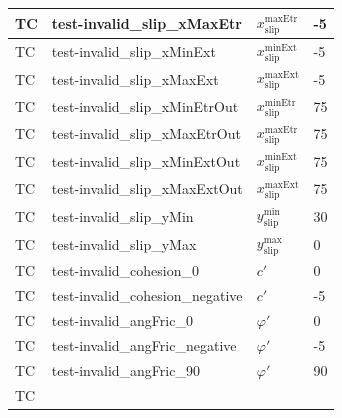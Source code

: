 \documentclass[12pt, titlepage]{article}
\newcounter{testnum} %
\begin{document}
\begin{longtable}{  l  p{5cm}  l  p{5cm}  }
	\hline
	TC{testnum}\thetestnum \label{TC_InvalidSlipXMaxEtr} & 
	test-invalid\_slip\_xMaxEtr & ${x_\text{slip}^\text{maxEtr}}$ & -5\\ 
	\hline
	TC{testnum}\thetestnum \label{TC_InvalidSlipXMinExt} & 
	test-invalid\_slip\_xMinExt & ${x_\text{slip}^\text{minExt}}$ & -5\\ 
	\hline
	TC{testnum}\thetestnum \label{TC_InvalidSlipXMaxExt} & 
	test-invalid\_slip\_xMaxExt & ${x_\text{slip}^\text{maxExt}}$ & -5\\ 
	\hline
	TC{testnum}\thetestnum \label{TC_InvalidSlipXMinEtrOut} & 
	test-invalid\_slip\_xMinEtrOut & ${x_\text{slip}^\text{minEtr}}$ & 75\\ 
	\hline
	TC{testnum}\thetestnum \label{TC_InvalidSlipXMaxEtrOut} & 
	test-invalid\_slip\_xMaxEtrOut & ${x_\text{slip}^\text{maxEtr}}$ & 75\\ 
	\hline
	TC{testnum}\thetestnum \label{TC_InvalidSlipXMinExtOut} & 
	test-invalid\_slip\_xMinExtOut & ${x_\text{slip}^\text{minExt}}$ & 75\\ 
	\hline
	TC{testnum}\thetestnum \label{TC_InvalidSlipXMaxExtOut} & 
	test-invalid\_slip\_xMaxExtOut & ${x_\text{slip}^\text{maxExt}}$ & 75\\ 
	\hline
	TC{testnum}\thetestnum \label{TC_InvalidSlipYMin} & 
	test-invalid\_slip\_yMin & ${y_\text{slip}^\text{min}}$ & 30\\ 
	\hline
	TC{testnum}\thetestnum \label{TC_InvalidSlipYMax} & 
	test-invalid\_slip\_yMax & ${y_\text{slip}^\text{max}}$ & 0\\ 
	\hline
	TC{testnum}\thetestnum \label{TC_InvalidCohesion0} & 
	test-invalid\_cohesion\_0 & $c'$ & 0\\ 
	\hline
	TC{testnum}\thetestnum \label{TC_InvalidCohesionNegative} & 
	test-invalid\_cohesion\_negative & $c'$ & -5\\ 
	\hline
	TC{testnum}\thetestnum \label{TC_InvalidAngFric0} & 
	test-invalid\_angFric\_0 & $\varphi'$ & 0\\ 
	\hline
	TC{testnum}\thetestnum \label{TC_InvalidAngFricNegative} & 
	test-invalid\_angFric\_negative & $\varphi'$ & -5\\ 
	\hline
	TC{testnum}\thetestnum \label{TC_InvalidAngFric90} & 
	test-invalid\_angFric\_90 & $\varphi'$ & 90\\ 
	\hline
	TC{testnum}\thetestnum \label{TC_InvalidAngFricObtuse} & 

\end{longtable}
\end{document}
